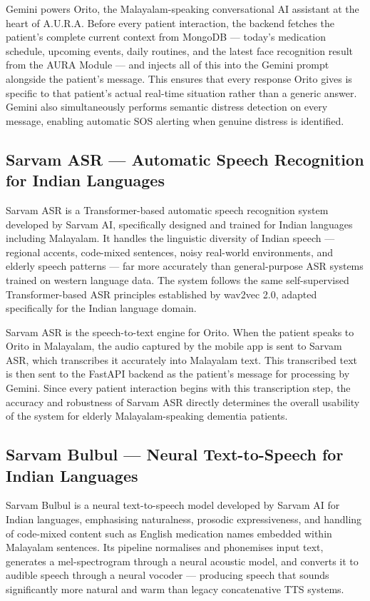 Gemini powers Orito, the Malayalam-speaking conversational AI assistant at the heart of A.U.R.A. Before every patient interaction, the backend fetches the patient's complete current context from MongoDB --- today's medication schedule, upcoming events, daily routines, and the latest face recognition result from the AURA Module --- and injects all of this into the Gemini prompt alongside the patient's message. This ensures that every response Orito gives is specific to that patient's actual real-time situation rather than a generic answer. Gemini also simultaneously performs semantic distress detection on every message, enabling automatic SOS alerting when genuine distress is identified.

\subsection{Sarvam ASR --- Automatic Speech Recognition for Indian Languages}
Sarvam ASR is a Transformer-based automatic speech recognition system developed by Sarvam AI, specifically designed and trained for Indian languages including Malayalam. It handles the linguistic diversity of Indian speech --- regional accents, code-mixed sentences, noisy real-world environments, and elderly speech patterns --- far more accurately than general-purpose ASR systems trained on western language data. The system follows the same self-supervised Transformer-based ASR principles established by wav2vec 2.0, adapted specifically for the Indian language domain.

Sarvam ASR is the speech-to-text engine for Orito. When the patient speaks to Orito in Malayalam, the audio captured by the mobile app is sent to Sarvam ASR, which transcribes it accurately into Malayalam text. This transcribed text is then sent to the FastAPI backend as the patient's message for processing by Gemini. Since every patient interaction begins with this transcription step, the accuracy and robustness of Sarvam ASR directly determines the overall usability of the system for elderly Malayalam-speaking dementia patients.

\subsection{Sarvam Bulbul --- Neural Text-to-Speech for Indian Languages}
Sarvam Bulbul is a neural text-to-speech model developed by Sarvam AI for Indian languages, emphasising naturalness, prosodic expressiveness, and handling of code-mixed content such as English medication names embedded within Malayalam sentences. Its pipeline normalises and phonemises input text, generates a mel-spectrogram through a neural acoustic model, and converts it to audible speech through a neural vocoder --- producing speech that sounds significantly more natural and warm than legacy concatenative TTS systems.

